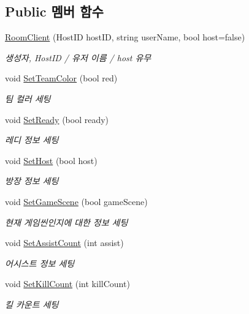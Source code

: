 \subsection*{Public 멤버 함수}
\begin{DoxyCompactItemize}
\item 
\hyperlink{class_room_client_a2cc526d1912c14c38858f07e5bac880d}{Room\+Client} (Host\+ID host\+ID, string user\+Name, bool host=false)
\begin{DoxyCompactList}\small\item\em 생성자, Host\+ID / 유저 이름 / host 유무 \end{DoxyCompactList}\item 
void \hyperlink{class_room_client_aa8ad3112c6dcf60baa32ad9561d78616}{Set\+Team\+Color} (bool red)
\begin{DoxyCompactList}\small\item\em 팀 컬러 세팅 \end{DoxyCompactList}\item 
void \hyperlink{class_room_client_a4f80f0ce1869b8ea80ad82aeef16e44b}{Set\+Ready} (bool ready)
\begin{DoxyCompactList}\small\item\em 레디 정보 세팅 \end{DoxyCompactList}\item 
void \hyperlink{class_room_client_abe7c9a89ab9ac294036914ca7ff169da}{Set\+Host} (bool host)
\begin{DoxyCompactList}\small\item\em 방장 정보 세팅 \end{DoxyCompactList}\item 
void \hyperlink{class_room_client_aa16788473bcf0c328d6ac3b1f269cfe6}{Set\+Game\+Scene} (bool game\+Scene)
\begin{DoxyCompactList}\small\item\em 현재 게임씬인지에 대한 정보 세팅 \end{DoxyCompactList}\item 
void \hyperlink{class_room_client_a6d250158da90c56d62a0b5ec7ecdd5aa}{Set\+Assist\+Count} (int assist)
\begin{DoxyCompactList}\small\item\em 어시스트 정보 세팅 \end{DoxyCompactList}\item 
void \hyperlink{class_room_client_af86bb780657acddb5b79a5fe9b21b134}{Set\+Kill\+Count} (int kill\+Count)
\begin{DoxyCompactList}\small\item\em 킬 카운트 세팅 \end{DoxyCompactList}\item 

\end{DoxyCompactItemize}
